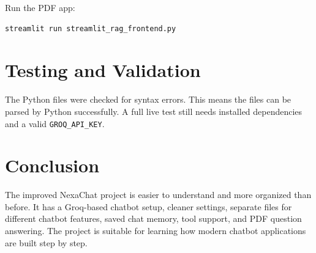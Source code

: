 \documentclass[12pt]{article}
\begin{document}
Run the PDF app:
\begin{verbatim}
streamlit run streamlit_rag_frontend.py
\end{verbatim}

\section{Testing and Validation}
The Python files were checked for syntax errors. This means the files can be parsed by Python successfully. A full live test still needs installed dependencies and a valid \texttt{GROQ\_API\_KEY}.

\section{Conclusion}
The improved NexaChat project is easier to understand and more organized than before. It has a Groq-based chatbot setup, cleaner settings, separate files for different chatbot features, saved chat memory, tool support, and PDF question answering. The project is suitable for learning how modern chatbot applications are built step by step.
\end{document}
